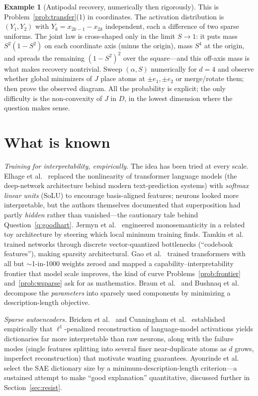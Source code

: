\documentclass[11pt]{amsart}
\theoremstyle{plain}
\theoremstyle{definition}
\newtheorem{example}[theorem]{Example}
\begin{document}
\begin{example}[Antipodal recovery, numerically then rigorously]
This is Problem~\ref{prob:transfer}(1) in coordinates. The activation distribution is $(Y_1,Y_2)$ with $Y_k = x_{2k-1}-x_{2k}$ independent, each a difference of two sparse uniforms. The joint law is cross-shaped only in the limit $S\to1$: it puts mass $S^2(1-S^2)$ on each coordinate axis (minus the origin), mass $S^4$ at the origin, and spreads the remaining $(1-S^2)^2$ over the square---and this off-axis mass is what makes recovery nontrivial. Sweep $(\alpha, S)$ numerically for $d=4$ and observe whether global minimizers of $J$ place atoms at $\pm e_1,\pm e_2$ or merge/rotate them; then prove the observed diagram. All the probability is explicit; the only difficulty is the non-convexity of $J$ in $D$, in the lowest dimension where the question makes sense.
\end{example}

\section{What is known}\label{sec:known}

\emph{Training for interpretability, empirically.} The idea has been tried at every scale. Elhage et al.\ \cite{elhage2022solu} replaced the nonlinearity of transformer language models (the deep-network architecture behind modern text-prediction systems) with \emph{softmax linear units} (SoLU) to encourage basis-aligned features; neurons looked more interpretable, but the authors themselves documented that superposition had partly \emph{hidden} rather than vanished---the cautionary tale behind Question~\ref{q:goodhart}. Jermyn et al.\ \cite{jermyn2022} engineered monosemanticity in a related toy architecture by steering which local minimum training finds. Tamkin et al.\ \cite{tamkin2023} trained networks through discrete vector-quantized bottlenecks (``codebook features''), making sparsity architectural. Gao et al.\ \cite{gao2025} trained transformers with all but $\sim$1-in-1000 weights zeroed and mapped a capability--interpretability frontier that model scale improves, the kind of curve Problems~\ref{prob:frontier} and~\ref{prob:wsparse} ask for as mathematics. Braun et al.\ \cite{braun2025} and Bushnaq et al.\ \cite{bushnaq2025} decompose the \emph{parameters} into sparsely used components by minimizing a description-length objective.

\emph{Sparse autoencoders.} Bricken et al.\ \cite{bricken2023} and Cunningham et al.\ \cite{cunningham2023} established empirically that $\ell^1$-penalized reconstruction of language-model activations yields dictionaries far more interpretable than raw neurons, along with the failure modes (single features splitting into several finer near-duplicate atoms as $d$ grows, imperfect reconstruction) that motivate wanting guarantees. Ayonrinde et al.\ \cite{ayonrinde2024} select the SAE dictionary size by a minimum-description-length criterion---a sustained attempt to make ``good explanation'' quantitative, discussed further in Section~\ref{sec:resist}.
\end{document}
